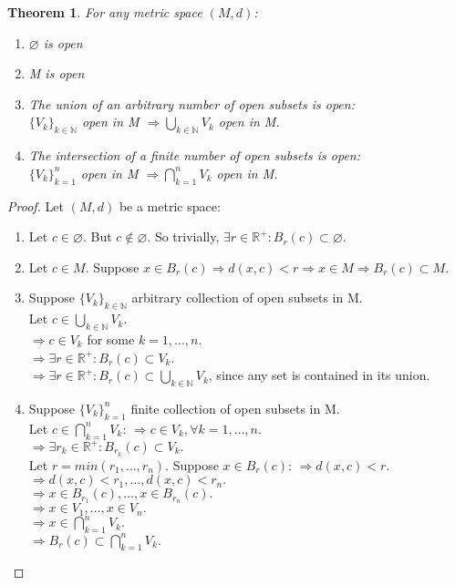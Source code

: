 \documentclass{article}
\newtheorem{theorem}{Theorem}[section]
\begin{document}
			\begin{theorem}
				For any metric space $(M, d)$:
				\begin{enumerate}
					\item $\varnothing$ is open
					\item M is open
					\item The union of an arbitrary number of open subsets is open: \\
					$\{V_{k}\}_{k \in \mathbb{N}}$ open in M $\Rightarrow \bigcup_{k \in \mathbb{N}} V_{k}$ open in M. 
					\item The intersection of a finite number of open subsets is open: \\
					$\{V_{k}\}_{k=1}^{n}$ open in M $\Rightarrow \bigcap_{k=1}^{n} V_{k}$ open in M.
				\end{enumerate}
			\end{theorem}
			\begin{proof} 
				Let $(M, d)$ be a metric space:
				\begin{enumerate}
					\item Let $c \in \varnothing$. But $c \notin \varnothing$. So trivially, $\exists r \in \mathbb{R^{+}}: B_{r}(c) \subset \varnothing$.
					\item Let $c \in M$. Suppose $x \in B_{r}(c) \Rightarrow d(x, c) < r \Rightarrow x \in M \Rightarrow B_{r}(c) \subset M$.
					\item Suppose $\{V_{k}\}_{k \in \mathbb{N}}$ arbitrary collection of open subsets in M. \\
						Let $c \in \bigcup_{k \in \mathbb{N}} V_{k}$. \\
						$\Rightarrow c \in V_{k}$ for some $k = 1, \ldots, n$. \\
						$\Rightarrow \exists r \in \mathbb{R^{+}}: B_{r}(c) \subset V_{k}$. \\
						$\Rightarrow \exists r \in \mathbb{R^{+}}: B_{r}(c) \subset \bigcup_{k \in \mathbb{N}} V_{k}$, since any set is contained in its union.
					\item Suppose $\{V_{k}\}_{k=1}^{n}$ finite collection of open subsets in M. \\
						Let $c \in \bigcap_{k=1}^{n} V_{k}$:
						$\Rightarrow c \in V_{k}, \forall k = 1, \ldots, n.$ \\
						$\Rightarrow \exists r_{k} \in \mathbb{R^{+}}: B_{r_{k}}(c) \subset V_{k}.$ \\
						Let $r = min(r_{1}, \ldots, r_{n})$. Suppose $x \in B_{r}(c)$:
						$\Rightarrow d(x, c) < r.$ \\
						$\Rightarrow d(x, c) < r_{1}, \ldots, d(x, c) < r_{n}.$ \\
						$\Rightarrow x \in B_{r_{1}}(c), \ldots, x \in B_{r_{n}}(c).$ \\
						$\Rightarrow x \in V_{1}, \ldots, x \in V_{n}.$ \\
						$\Rightarrow x \in \bigcap_{k=1}^{n} V_{k}.$ \\
						$\Rightarrow B_{r}(c) \subset \bigcap_{k=1}^{n} V_{k}.$
				\end{enumerate}
			\end{proof}
\end{document}
